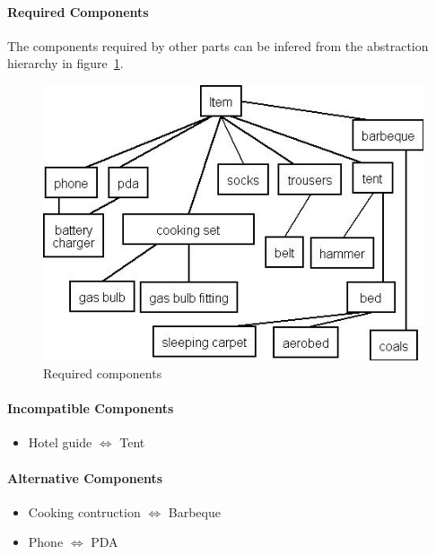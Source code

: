 \documentclass[a4paper,11pt]{article}
\begin{document}
\paragraph{Required Components}

The components required by other parts can be infered from the abstraction 
hierarchy in figure~\ref{figuur:RequiredComponents}.

\begin{figure}
\begin{center}
\includegraphics{subcomponents.jpg}
\end{center}
\caption{Required components}
\label{figuur:RequiredComponents}
\end{figure}

\paragraph{Incompatible Components}

\begin{itemize}
\item Hotel guide $\Leftrightarrow$ Tent
\end{itemize}

\paragraph{Alternative Components}

\begin{itemize}
\item Cooking contruction $\Leftrightarrow$ Barbeque
\item Phone $\Leftrightarrow$ PDA
\end{itemize}
\end{document}
